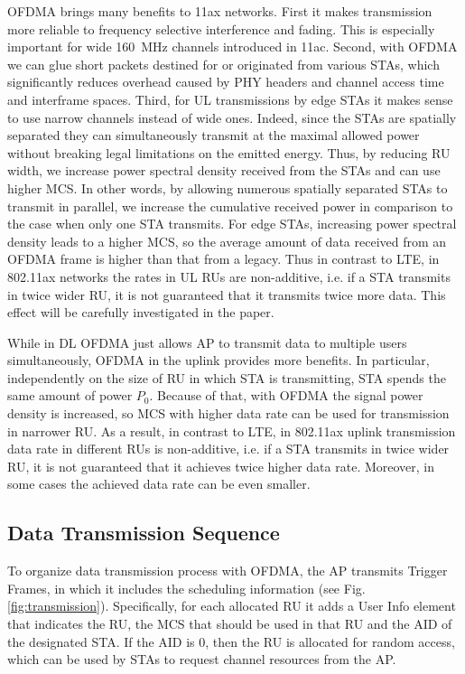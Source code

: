 OFDMA brings many benefits to 11ax networks.
First it makes transmission more reliable to frequency selective interference and fading.
This is especially important for wide \SI{160}{MHz} channels introduced in 11ac.
Second, with OFDMA we can glue short packets destined for or originated from various STAs, which significantly reduces overhead caused by PHY headers and channel access time and interframe spaces.
Third, for UL transmissions by edge STAs it makes sense to use narrow channels instead of wide ones.
Indeed, since the STAs are spatially separated they can simultaneously transmit at the maximal allowed power without breaking legal limitations on the emitted energy.
Thus, by reducing RU width, we increase power spectral density received from the STAs and can use higher MCS.
In other words, by allowing numerous spatially separated STAs to transmit in parallel, we increase the cumulative received power in comparison to the case when only one STA transmits.
For edge STAs, increasing power spectral density leads to a higher MCS, so  the average amount of data received from an OFDMA frame is higher than that from a legacy.
Thus in contrast to LTE, in 802.11ax networks the rates in UL RUs are non-additive, i.e. if a STA transmits in twice wider RU, it is not guaranteed that it transmits twice more data.
This effect will be carefully investigated in the paper.

While in DL OFDMA just allows AP to transmit data to multiple users simultaneously, OFDMA in the uplink provides more benefits. In particular, independently on the size of RU in which STA is transmitting, STA spends the same amount of power $P_0$. Because of that, with OFDMA the signal power density is increased, so MCS with higher data rate can be used for transmission in narrower RU. As a result, in contrast to LTE, in 802.11ax uplink transmission data rate in different RUs is non-additive, i.e. if a STA transmits in twice wider RU, it is not guaranteed that it achieves twice higher data rate. Moreover, in some cases the achieved data rate can be even smaller.

\subsection{Data Transmission Sequence}
To organize data transmission process with OFDMA, the AP transmits Trigger Frames, in which it includes the scheduling information (see Fig. \ref{fig:transmission}).
Specifically, for each allocated RU it adds a User Info element that indicates the RU, the MCS that should be used in that RU and the AID of the designated STA.
If the AID is $0$, then the RU is allocated for random access, which can be used by STAs to request channel resources from the AP.

